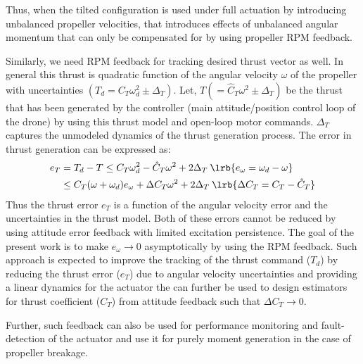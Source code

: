 

Thus, when the tilted configuration is used under full actuation by introducing unbalanced propeller velocities, that introduces effects of unbalanced angular momentum that can only be compensated for by using propeller RPM feedback.

Similarly, we need RPM feedback for tracking desired thrust vector as well.  In general this thrust is quadratic
function of the angular velocity $\omega$ of the propeller with uncertainties $(T_d = C_T \omega_d^2 \pm \Delta_T)$.
Let, $T (=\hat C_T \omega^2 \pm \Delta_T)$ be the thrust that has been generated by the controller (main
attitude/position control loop of the drone) by using this thrust model and open-loop motor commands. $\Delta_T$
captures the unmodeled dynamics of the thrust generation process. The error in thrust generation can be expressed as:
\begin{align*}
    e_T &= T_d - T \leq C_T \omega_d^2 - \hat C_T \omega^2 + 2 \Delta_T \:
     \lrb{e_{\omega} = \omega_d - \omega}\\
        &\leq C_T (\omega + \omega_d) e_{\omega} + \Delta C_T \omega^2 + 2 \Delta_T \: \lrb{\Delta C_T = C_T - \hat C_T}
\end{align*}
Thus the thrust error $e_T$ is a function of the angular velocity error and the uncertainties in the thrust model. Both
of these errors cannot be reduced by using attitude error feedback with limited excitation persistence. The goal of the
present work is to make $e_\omega \rightarrow 0$ asymptotically by using the RPM feedback. Such approach is expected to
improve the tracking of the thrust command ($T_d$) by reducing the thrust error ($e_T$) due to angular velocity
uncertainties and providing a linear dynamics for the actuator the can further be used to design estimators for thrust
coefficient ($C_T$) from attitude feedback such that $\Delta C_T \rightarrow 0$.

Further, such feedback can also be used for performance monitoring and fault-detection of the actuator and use it for purely moment generation in the case of propeller breakage.
